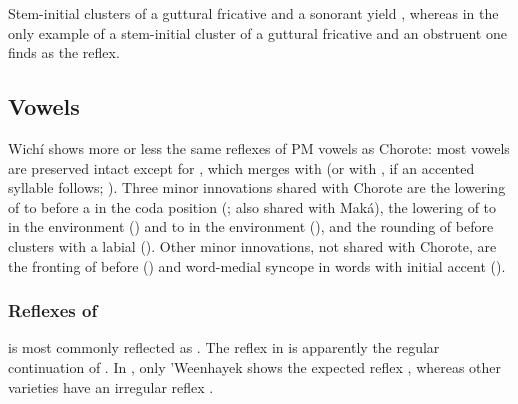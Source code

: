 \begin{exe}
    \ex \toad
\end{exe}

Stem-initial clusters of a guttural fricative and a sonorant yield , whereas in the only example of a stem-initial cluster of a guttural fricative and an obstruent one finds  as the reflex.

\begin{exe}
    \ex \spring
    \ex \fox
    \ex \shadow
    \ex \moon
\end{exe}

\subsection{Vowels} \label{wi-vow}

Wichí shows more or less the same reflexes of PM vowels as Chorote: most vowels are preserved intact except for , which merges with  (or with , if an accented syllable follows; ). Three minor innovations shared with Chorote are the lowering of  to  before a  in the coda position (; also shared with Maká), the lowering of  to  in the environment  () and to  in the environment  (), and the rounding of  before clusters with a labial (). Other minor innovations, not shared with Chorote, are the fronting of  before  () and word-medial syncope in words with initial accent ().

\subsubsection{Reflexes of } \label{pm-wi-ae}
 is most commonly reflected as . The reflex  in  is apparently the regular continuation of . In , only 'Weenhayek shows the expected reflex , whereas other varieties have an irregular reflex .

\begin{exe}
    \ex \burn
    \ex \wing
    \ex \yicaay
    \ex \goawayyou
    \ex \goawaycisl
    \ex \putv
    \ex \flyv \label{wi-ae-flyv}
    \ex \tell
    \ex \rootn
    \ex \coldweather
    \ex \dreamn
    \ex \killbird
    \ex \hole
    \ex \spouse
    \ex \stretchout
    \ex \dividev
    \ex \chaniarf
    \ex \chaniart
    \ex \flu
    \ex \mesh
    \ex \acquainted
    \ex \abdcavity
    \ex \basetrunk
    \ex \bilecw
    \ex \allrcpr
    \ex \burrow
    \ex \walk
    \ex \seev
    \ex \placen
    \ex \egg \label{wi-ae-egg}
    \ex \vrbpl
    \ex \headn
    \ex \eatvi
\end{exe}

